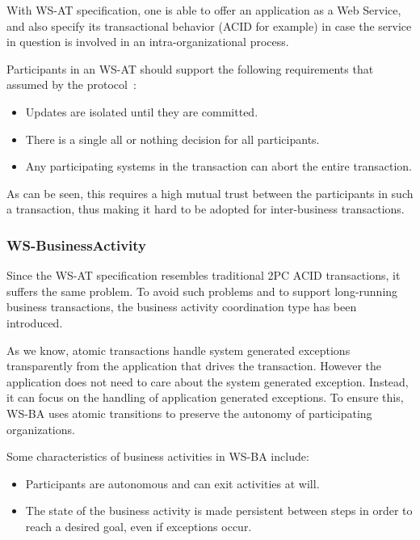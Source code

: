 \documentclass{sig-alternate-05-2015}
\begin{document}
With WS-AT specification, one is able to offer an application as a Web
Service, and also specify its transactional behavior (ACID for
example) in case the service in question is involved in an
intra-organizational process.

Participants in an WS-AT should support the following requirements
that assumed by the protocol~\cite{wsat}:

\begin{itemize}
\item Updates are isolated until they are committed.
\item There is a single all or nothing decision for all participants.
\item Any participating systems in the transaction can abort the
  entire transaction.
\end{itemize}

As can be seen, this requires a high mutual trust between the
participants in such a transaction, thus making it hard to be adopted
for inter-business transactions.


\subsubsection{WS-BusinessActivity}
\label{sec:wsba}

Since the WS-AT specification resembles traditional 2PC ACID
transactions, it suffers the same problem. To avoid such problems and
to support long-running business transactions, the business activity
coordination type has been introduced.

As we know, atomic transactions handle system generated exceptions
transparently from the application that drives the
transaction. However the application does not need to care about the
system generated exception. Instead, it can focus on the handling of
application generated exceptions. To ensure this, WS-BA uses atomic
transitions to preserve the autonomy of participating organizations.

Some characteristics of business activities in WS-BA include:

\begin{itemize}
\item Participants are autonomous and can exit activities at will.
\item The state of the business activity is made persistent between
  steps in order to reach a desired goal, even if exceptions occur.
\end{itemize}
\end{document}
